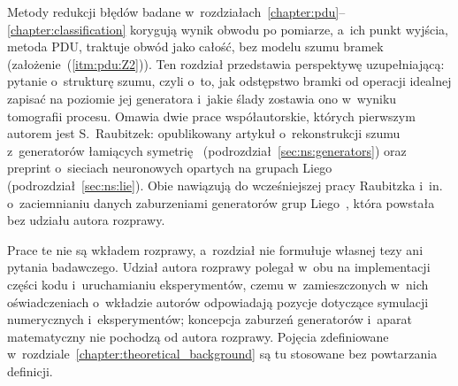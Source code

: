 Metody redukcji błędów badane w~rozdziałach~\ref{chapter:pdu}--\ref{chapter:classification} korygują wynik obwodu po pomiarze, a~ich punkt wyjścia, metoda PDU, traktuje obwód jako całość, bez modelu szumu bramek (założenie~(\ref{itm:pdu:Z2})).
Ten rozdział przedstawia perspektywę uzupełniającą: pytanie o~strukturę szumu, czyli o~to, jak odstępstwo bramki od operacji idealnej zapisać na poziomie jej generatora i~jakie ślady zostawia ono w~wyniku tomografii procesu.
Omawia dwie prace współautorskie, których pierwszym autorem jest S.~Raubitzek: opublikowany artykuł o~rekonstrukcji szumu z~generatorów łamiących symetrię~\cite{raubitzek_quantum_noise} (podrozdział~\ref{sec:ns:generators}) oraz preprint o~sieciach neuronowych opartych na grupach Liego~\cite{raubitzek_lie_group_manuscript} (podrozdział~\ref{sec:ns:lie}).
Obie nawiązują do wcześniejszej pracy Raubitzka i~in. o~zaciemnianiu danych zaburzeniami generatorów grup Liego~\cite{raubitzek_obfuscation_2025}, która powstała bez udziału autora rozprawy.

Prace te nie są wkładem rozprawy, a~rozdział nie formułuje własnej tezy ani pytania badawczego.
Udział autora rozprawy polegał w~obu na implementacji części kodu i~uruchamianiu eksperymentów, czemu w~zamieszczonych w~nich oświadczeniach o~wkładzie autorów odpowiadają pozycje dotyczące symulacji numerycznych i~eksperymentów; koncepcja zaburzeń generatorów i~aparat matematyczny nie pochodzą od autora rozprawy.
Pojęcia zdefiniowane w~rozdziale~\ref{chapter:theoretical_background} są tu stosowane bez powtarzania definicji.

